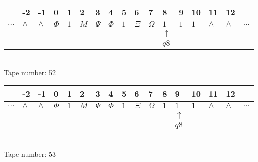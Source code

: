 \documentclass{article}
\begin{document}
\begin{table}[H]
\centering
\begin{tabular}{lllllllllllllllll}
 & -2 & -1 & 0 & 1 & 2 & 3 & 4 & 5 & 6 & 7 & 8 & 9 & 10 & 11 & 12 & \\
\hline
$...$ & \multicolumn{1}{|l|}{$\wedge$} & \multicolumn{1}{|l|}{$\wedge$} & \multicolumn{1}{|l|}{$\Phi$} & \multicolumn{1}{|l|}{$1$} & \multicolumn{1}{|l|}{$M$} & \multicolumn{1}{|l|}{$\Psi$} & \multicolumn{1}{|l|}{$\Phi$} & \multicolumn{1}{|l|}{$1$} & \multicolumn{1}{|l|}{$\Xi$} & \multicolumn{1}{|l|}{$\Omega$} & \multicolumn{1}{|l|}{$1$} & \multicolumn{1}{|l|}{$1$} & \multicolumn{1}{|l|}{$1$} & \multicolumn{1}{|l|}{$\wedge$} & \multicolumn{1}{|l|}{$\wedge$} & $...$\\
\hline
&  &  &  &  &  &  &  &  &  &  & $\uparrow$ &  &  &  &  &  \\
&  &  &  &  &  &  &  &  &  &  & $ q8 $ &  &  &  &  &  \\
\end{tabular}
\\
Tape number: 52
\noindent\makebox[\linewidth]{\hdashrule{\textwidth}{1pt}{1pt}}\end{table}

\begin{table}[H]
\centering
\begin{tabular}{lllllllllllllllll}
 & -2 & -1 & 0 & 1 & 2 & 3 & 4 & 5 & 6 & 7 & 8 & 9 & 10 & 11 & 12 & \\
\hline
$...$ & \multicolumn{1}{|l|}{$\wedge$} & \multicolumn{1}{|l|}{$\wedge$} & \multicolumn{1}{|l|}{$\Phi$} & \multicolumn{1}{|l|}{$1$} & \multicolumn{1}{|l|}{$M$} & \multicolumn{1}{|l|}{$\Psi$} & \multicolumn{1}{|l|}{$\Phi$} & \multicolumn{1}{|l|}{$1$} & \multicolumn{1}{|l|}{$\Xi$} & \multicolumn{1}{|l|}{$\Omega$} & \multicolumn{1}{|l|}{$1$} & \multicolumn{1}{|l|}{$1$} & \multicolumn{1}{|l|}{$1$} & \multicolumn{1}{|l|}{$\wedge$} & \multicolumn{1}{|l|}{$\wedge$} & $...$\\
\hline
&  &  &  &  &  &  &  &  &  &  &  & $\uparrow$ &  &  &  &  \\
&  &  &  &  &  &  &  &  &  &  &  & $ q8 $ &  &  &  &  \\
\end{tabular}
\\
Tape number: 53
\noindent\makebox[\linewidth]{\hdashrule{\textwidth}{1pt}{1pt}}\end{table}
\clearpage
\end{document}
